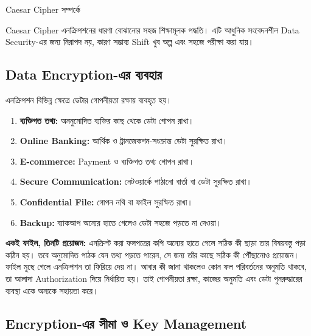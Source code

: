 \begin{mistakebox}{Caesar Cipher সম্পর্কে}

Caesar Cipher এনক্রিপশনের ধারণা বোঝানোর সহজ শিক্ষামূলক
পদ্ধতি। এটি আধুনিক সংবেদনশীল Data Security-এর জন্য নিরাপদ নয়,
কারণ সম্ভাব্য Shift খুব অল্প এবং সহজে পরীক্ষা করা যায়।

\end{mistakebox}



\subsection{Data Encryption-এর ব্যবহার}

এনক্রিপশন বিভিন্ন ক্ষেত্রে ডেটার গোপনীয়তা রক্ষায় ব্যবহৃত হয়।

\begin{enumerate}
\item \textbf{ব্যক্তিগত তথ্য:} অননুমোদিত ব্যক্তির কাছ থেকে ডেটা গোপন রাখা।
\item \textbf{Online Banking:} আর্থিক ও ট্রানজেকশন-সংক্রান্ত ডেটা সুরক্ষিত রাখা।
\item \textbf{E-commerce:} Payment ও ব্যক্তিগত তথ্য গোপন রাখা।
\item \textbf{Secure Communication:} নেটওয়ার্কে পাঠানো বার্তা বা ডেটা সুরক্ষিত রাখা।
\item \textbf{Confidential File:} গোপন নথি বা ফাইল সুরক্ষিত রাখা।
\item \textbf{Backup:} ব্যাকআপ অন্যের হাতে গেলেও ডেটা সহজে পড়তে না দেওয়া।
\end{enumerate}




\textbf{একই ফাইল, তিনটি প্রয়োজন:} এনক্রিপ্ট করা ফলপত্রের কপি অন্যের হাতে গেলে সঠিক কী ছাড়া তার বিষয়বস্তু পড়া কঠিন হয়। তবে অনুমোদিত পাঠক যেন তথ্য পড়তে পারেন, সে জন্য তাঁর কাছে সঠিক কী পৌঁছানোও প্রয়োজন। ফাইল মুছে গেলে এনক্রিপশন তা ফিরিয়ে দেয় না। আবার কী জানা থাকলেও কোন ফল পরিবর্তনের অনুমতি থাকবে, তা আলাদা Authorization দিয়ে নির্ধারিত হয়। তাই গোপনীয়তা রক্ষা, কাজের অনুমতি এবং ডেটা পুনরুদ্ধারের ব্যবস্থা একে অন্যকে সহায়তা করে।

\subsection{Encryption-এর সীমা ও Key Management}

